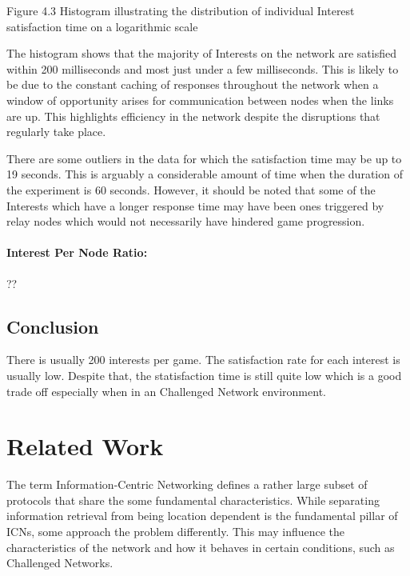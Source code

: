 \documentclass[a4paper,12pt]{report}      %
\begin{document}
\begin{center}Figure 4.3 Histogram illustrating the distribution of individual Interest satisfaction time on a logarithmic scale\end{center}

The histogram shows that the majority of Interests on the network are satisfied within 200 milliseconds
and most just under a few milliseconds. This is likely to be due to the constant caching of responses
throughout the network when a window of opportunity arises for communication between nodes when
the links are up. This highlights efficiency in the network despite the disruptions that regularly take
place.

There are some outliers in the data for which the satisfaction time may be up to 19 seconds. This is
arguably a considerable amount of time when the duration of the experiment is 60 seconds. However, it
should be noted that some of the Interests which have a longer response time may have been ones
triggered by relay nodes which would not necessarily have hindered game progression.

\subsubsection{Interest Per Node Ratio:} 

??

\section{Conclusion}

There is usually 200 interests per game. The satisfaction rate for each interest is usually low. Despite that, the statisfaction time is still quite low which is a good trade off especially when in an Challenged Network environment.

\pagebreak
\chapter{Related Work}

The term Information-Centric Networking defines a rather large subset of protocols that share the some
fundamental characteristics. While separating information retrieval from being location dependent is
the fundamental pillar of ICNs, some approach the problem differently. This may influence the
characteristics of the network and how it behaves in certain conditions, such as Challenged Networks.
\end{document}
